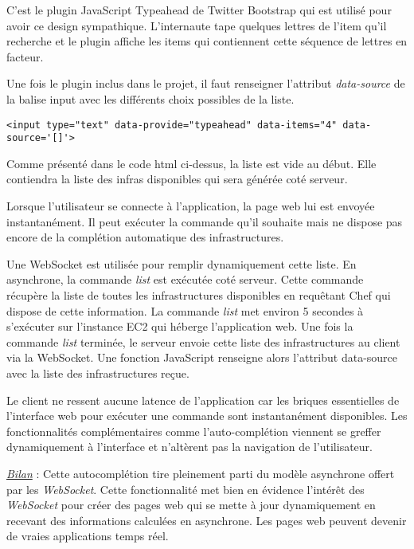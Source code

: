 C'est le plugin JavaScript Typeahead de Twitter Bootstrap qui est utilisé pour
avoir ce design sympathique. L'internaute tape quelques lettres de l'item qu'il
recherche et le plugin affiche les items qui contiennent cette séquence de
lettres en facteur.

Une fois le plugin inclus dans le projet, il faut renseigner l'attribut
\textit{data-source} de la balise input avec les différents choix possibles de
la liste.

\lstset{language=XML}
\begin{lstlisting}[caption=utilisation de bootstrap-typeahead]
  <input type="text" data-provide="typeahead" data-items="4" data-source='[]'>
\end{lstlisting}

Comme présenté dans le code html ci-dessus, la liste est vide au début.
Elle contiendra la liste des infras disponibles qui sera générée coté serveur.

Lorsque l'utilisateur se connecte à l'application, la page web lui est envoyée
instantanément. Il peut exécuter la commande qu'il souhaite mais ne
dispose pas encore de la complétion automatique des infrastructures.

Une WebSocket est utilisée pour remplir dynamiquement cette liste.
En asynchrone, la commande \textit{list} est exécutée coté serveur.
Cette commande récupère la liste de toutes les infrastructures disponibles en
requêtant Chef qui dispose de cette information. La commande \textit{list} met
environ 5 secondes à s'exécuter sur l'instance EC2 qui héberge l'application
web.
Une fois la commande \textit{list} terminée, le serveur envoie cette liste des
infrastructures au client via la WebSocket.
Une fonction JavaScript renseigne alors l'attribut data-source avec
la liste des infrastructures reçue.

Le client ne ressent aucune latence de l'application car les briques essentielles
de l'interface web pour exécuter une commande sont instantanément disponibles.
Les fonctionnalités complémentaires comme l'auto-complétion viennent se greffer
dynamiquement à l'interface et n'altèrent pas la navigation de l'utilisateur.

\underline{\textit{Bilan}} : Cette autocomplétion tire pleinement parti du
modèle asynchrone offert par les \textit{WebSocket}. Cette fonctionnalité met
bien en évidence l'intérêt des \textit{WebSocket} pour créer des pages web qui
se mette à jour dynamiquement en recevant des informations calculées en
asynchrone. Les pages web peuvent devenir de vraies applications temps réel.


